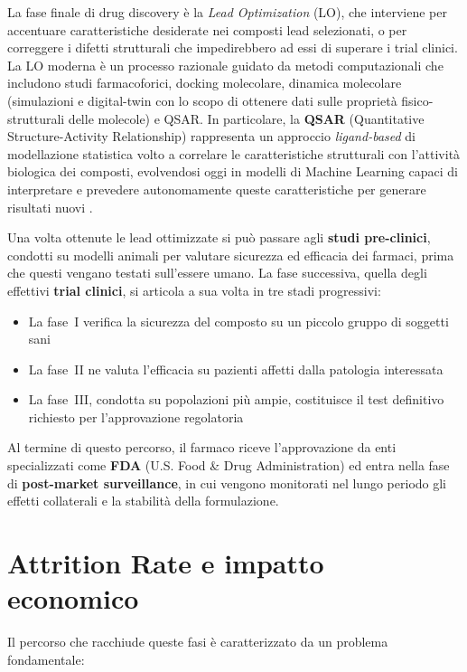 La fase finale di drug discovery è la \textit{Lead Optimization} (LO), che interviene per accentuare caratteristiche desiderate nei composti lead selezionati, o per correggere i difetti strutturali che impedirebbero ad essi di superare i trial clinici.
La LO moderna è un processo razionale guidato da metodi computazionali che includono studi farmacoforici, docking molecolare, dinamica molecolare (simulazioni e digital-twin con lo scopo di ottenere dati sulle proprietà fisico-strutturali delle molecole) e QSAR. 
In particolare, la \textbf{QSAR} (Quantitative Structure-Activity Relationship) rappresenta un approccio \textit{ligand-based} di modellazione statistica volto a correlare le caratteristiche strutturali con l'attività biologica dei composti, evolvendosi oggi in modelli di Machine Learning capaci di interpretare e prevedere autonomamente queste caratteristiche per generare risultati nuovi \cite{barcelosLeadOptimizationDrug2022}.

Una volta ottenute le lead ottimizzate si può passare agli \textbf{studi pre-clinici}, condotti su modelli animali per valutare 
sicurezza ed efficacia dei farmaci, prima che questi vengano testati sull'essere umano. 
La fase successiva, quella degli effettivi \textbf{trial clinici}, si 
articola a sua volta in tre stadi progressivi: 
\begin{itemize}
    \item La fase~I verifica la 
sicurezza del composto su un piccolo gruppo di soggetti sani
    \item La fase~II ne valuta l'efficacia su pazienti affetti dalla patologia interessata
    \item La fase~III, condotta su popolazioni più ampie, 
costituisce il test definitivo richiesto per l'approvazione regolatoria 
\end{itemize}  
Al termine di questo percorso, il farmaco riceve l'approvazione da enti specializzati come \textbf{FDA} (U.S. Food \& Drug Administration) ed entra nella fase 
di \textbf{post-market surveillance}, in cui vengono monitorati nel 
lungo periodo gli effetti collaterali e la stabilità della formulazione.
\section{Attrition Rate e impatto economico}
Il percorso che racchiude queste fasi è caratterizzato da un problema fondamentale:

